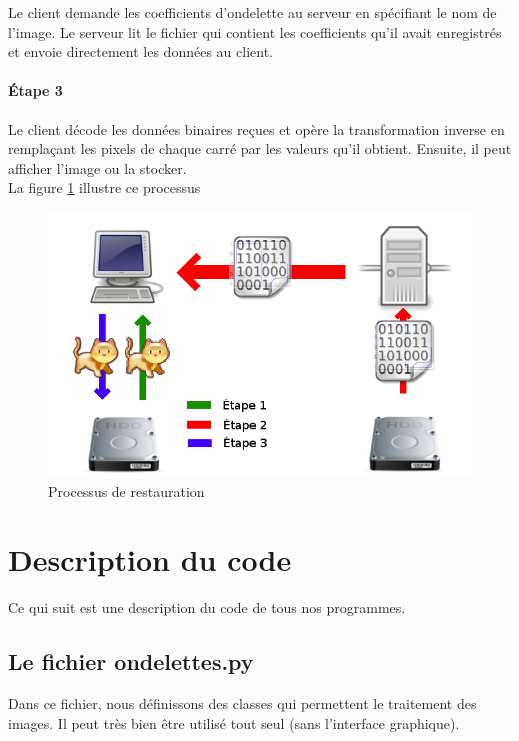 \documentclass{article}
\begin{document}
Le client demande les coefficients d'ondelette au serveur en spécifiant le nom de l'image. Le serveur lit le fichier qui contient les coefficients qu'il avait enregistrés et envoie directement les données au client.

\paragraph{Étape 3}

Le client décode les données binaires reçues et opère la transformation inverse en remplaçant les pixels de chaque carré par les valeurs qu'il obtient. Ensuite, il peut afficher l'image ou la stocker.\\

La figure \ref{load} illustre ce processus

 
\begin{figure}[!h]
\centering
\includegraphics[scale=0.5]{load.png}
\caption{Processus de restauration}
\label{load}
\end{figure}


\clearpage

\section{Description du code}

Ce qui suit est une description du code de tous nos programmes.

\subsection{Le fichier ondelettes.py }

Dans ce fichier, nous définissons des classes qui permettent le traitement des images. Il peut très bien être utilisé tout seul (sans l'interface graphique). 
\end{document}

